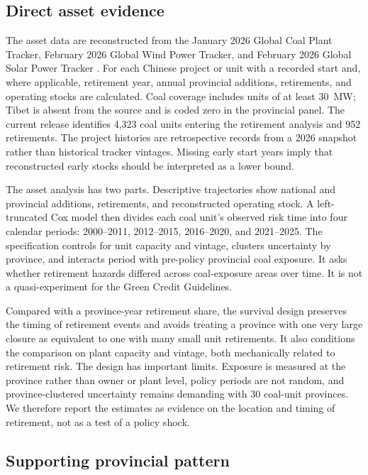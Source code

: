 \documentclass[11pt]{article}
\begin{document}
\subsection{Direct asset evidence}

The asset data are reconstructed from the January 2026 Global Coal Plant Tracker, February 2026 Global Wind Power Tracker, and February 2026 Global Solar Power Tracker \parencite{gem2026}. For each Chinese project or unit with a recorded start and, where applicable, retirement year, annual provincial additions, retirements, and operating stocks are calculated. Coal coverage includes units of at least 30~MW; Tibet is absent from the source and is coded zero in the provincial panel. The current release identifies 4,323 coal units entering the retirement analysis and 952 retirements. The project histories are retrospective records from a 2026 snapshot rather than historical tracker vintages. Missing early start years imply that reconstructed early stocks should be interpreted as a lower bound.

The asset analysis has two parts. Descriptive trajectories show national and provincial additions, retirements, and reconstructed operating stock. A left-truncated Cox model then divides each coal unit's observed risk time into four calendar periods: 2000--2011, 2012--2015, 2016--2020, and 2021--2025. The specification controls for unit capacity and vintage, clusters uncertainty by province, and interacts period with pre-policy provincial coal exposure. It asks whether retirement hazards differed across coal-exposure areas over time. It is not a quasi-experiment for the Green Credit Guidelines.

Compared with a province-year retirement share, the survival design preserves the timing of retirement events and avoids treating a province with one very large closure as equivalent to one with many small unit retirements. It also conditions the comparison on plant capacity and vintage, both mechanically related to retirement risk. The design has important limits. Exposure is measured at the province rather than owner or plant level, policy periods are not random, and province-clustered uncertainty remains demanding with 30 coal-unit provinces. We therefore report the estimates as evidence on the location and timing of retirement, not as a test of a policy shock.

\subsection{Supporting provincial pattern}
\end{document}
